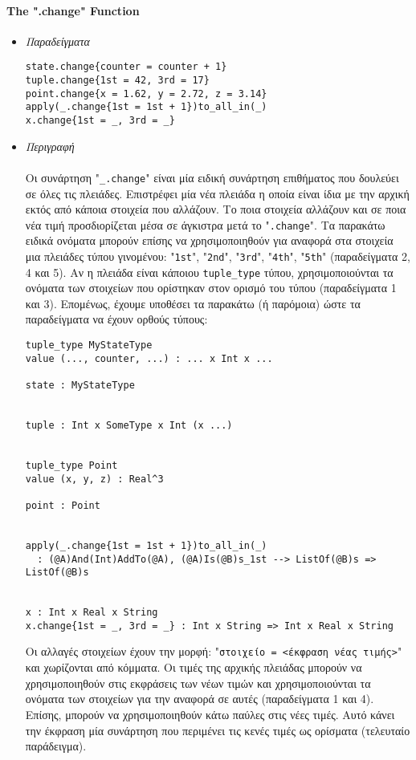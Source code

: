 \documentclass[diploma]{softlab-thesis}
\begin{document}
\paragraph{The ".change" Function}

\begin{itemize}

\item \textit{Παραδείγματα}

\begin{verbatim}
state.change{counter = counter + 1}
tuple.change{1st = 42, 3rd = 17}
point.change{x = 1.62, y = 2.72, z = 3.14}
apply(_.change{1st = 1st + 1})to_all_in(_)
x.change{1st = _, 3rd = _}
\end{verbatim}

\item \textit{Περιγραφή}
\\\\
Οι συνάρτηση "\verb|_.change|" είναι μία ειδική συνάρτηση επιθήματος που
δουλεύει σε όλες τις πλειάδες. Επιστρέφει μία νέα πλειάδα η οποία είναι ίδια με
την αρχική εκτός από κάποια στοιχεία που αλλάζουν. Το ποια στοιχεία αλλάζουν
και σε ποια νέα τιμή προσδιορίζεται μέσα σε άγκιστρα μετά το "\verb|.change|".
Τα παρακάτω ειδικά ονόματα μπορούν επίσης να χρησιμοποιηθούν για αναφορά στα
στοιχεία μια πλειάδες τύπου γινομένου: "\verb|1st|", "\verb|2nd|",
"\verb|3rd|", "\verb|4th|", "\verb|5th|" (παραδείγματα 2, 4 και 5). Αν η
πλειάδα είναι κάποιου \verb|tuple_type| τύπου, χρησιμοποιούνται τα ονόματα των
στοιχείων που ορίστηκαν στον ορισμό του τύπου (παραδείγματα 1 και 3).
Επομένως, έχουμε υποθέσει τα παρακάτω (ή παρόμοια) ώστε τα παραδείγματα να
έχουν ορθούς τύπους:

\begin{verbatim}
tuple_type MyStateType
value (..., counter, ...) : ... x Int x ...

state : MyStateType


tuple : Int x SomeType x Int (x ...)


tuple_type Point
value (x, y, z) : Real^3

point : Point


apply(_.change{1st = 1st + 1})to_all_in(_)
  : (@A)And(Int)AddTo(@A), (@A)Is(@B)s_1st --> ListOf(@B)s => ListOf(@B)s


x : Int x Real x String
x.change{1st = _, 3rd = _} : Int x String => Int x Real x String
\end{verbatim}

Οι αλλαγές στοιχείων έχουν την μορφή: "\verb|στοιχείο = <έκφραση νέας τιμής>|"
και χωρίζονται από κόμματα. Οι τιμές της αρχικής πλειάδας μπορούν να
χρησιμοποιηθούν στις εκφράσεις των νέων τιμών και χρησιμοποιούνται τα ονόματα
των στοιχείων για την αναφορά σε αυτές (παραδείγματα 1 και 4). Επίσης, μπορούν
να χρησιμοποιηθούν κάτω παύλες στις νέες τιμές. Αυτό κάνει την έκφραση μία
συνάρτηση που περιμένει τις κενές τιμές ως ορίσματα (τελευταίο παράδειγμα).

\end{itemize}
\end{document}
